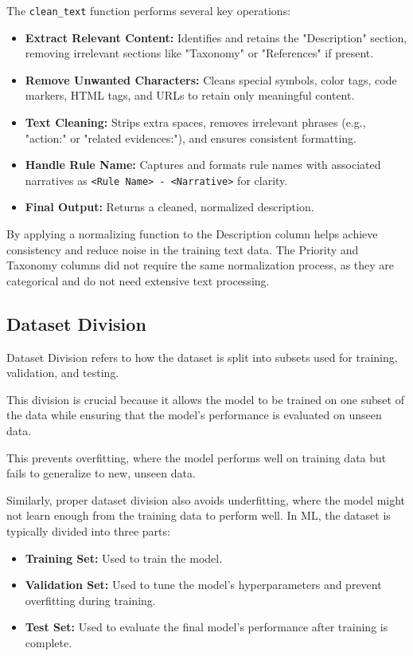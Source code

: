 The \texttt{clean\_text} function performs several key operations:

\begin{itemize}
    \item \textbf{Extract Relevant Content:} Identifies and retains the "Description" section, removing irrelevant sections like "Taxonomy" or "References" if present.
    \item \textbf{Remove Unwanted Characters:} Cleans special symbols, color tags, code markers, HTML tags, and URLs to retain only meaningful content.
    \item \textbf{Text Cleaning:} Strips extra spaces, removes irrelevant phrases (e.g., "action:" or "related evidences:"), and ensures consistent formatting.
    \item \textbf{Handle Rule Name:} Captures and formats rule names with associated narratives as \texttt{<Rule Name> - <Narrative>} for clarity.
    \item \textbf{Final Output:} Returns a cleaned, normalized description.
\end{itemize}

By applying a normalizing function to the Description column helps achieve consistency and reduce noise in the training text data.
The Priority and Taxonomy columns did not require the same normalization process, as they are categorical and do not need extensive text processing.

\subsection{Dataset Division}
Dataset Division refers to how the dataset is split into subsets used for training, validation, and testing. 

This division is crucial because it allows the model to be trained on one subset of the data while ensuring that the model's performance is evaluated on unseen data. 

This prevents overfitting, where the model performs well on training data but fails to generalize to new, unseen data. 

Similarly, proper dataset division also avoids underfitting, where the model might not learn enough from the training data to perform well.
\clearpage
In ML, the dataset is typically divided into three parts:
\begin{itemize}
    \item \textbf{Training Set:} Used to train the model.
    \item \textbf{Validation Set:} Used to tune the model's hyperparameters and prevent overfitting during training.
    \item \textbf{Test Set:} Used to evaluate the final model's performance after training is complete.
\end{itemize}

